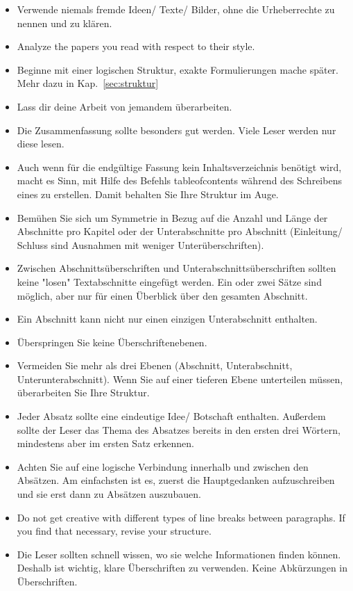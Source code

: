\begin{itemize}
\item  Verwende niemals fremde Ideen/ Texte/ Bilder, ohne die Urheberrechte zu nennen und zu klären. 
\item  Analyze the papers you read with respect to their style.	
\item  Beginne mit einer logischen Struktur, exakte Formulierungen mache später. Mehr dazu in Kap.~\ref{sec:struktur}
\item Lass dir deine Arbeit von jemandem überarbeiten.
\item  Die Zusammenfassung sollte besonders gut werden. Viele Leser werden nur diese lesen.
\item  Auch wenn für die endgültige Fassung kein Inhaltsverzeichnis benötigt wird, macht es Sinn, mit Hilfe des Befehls 
tableofcontents während des Schreibens eines zu erstellen. Damit behalten Sie Ihre Struktur im Auge. %
\item Bemühen Sie sich um Symmetrie in Bezug auf die Anzahl und Länge der Abschnitte pro Kapitel oder der Unterabschnitte pro Abschnitt (Einleitung/ Schluss sind Ausnahmen mit weniger Unterüberschriften). 



\item Zwischen Abschnittsüberschriften und Unterabschnittsüberschriften sollten keine "losen" Textabschnitte eingefügt werden. Ein oder zwei Sätze sind möglich, aber nur für einen Überblick über den gesamten Abschnitt.


\item Ein Abschnitt kann nicht nur einen einzigen Unterabschnitt enthalten.

\item Überspringen Sie keine Überschriftenebenen.


\item Vermeiden Sie mehr als drei Ebenen (Abschnitt, Unterabschnitt, Unterunterabschnitt). Wenn Sie auf einer tieferen Ebene unterteilen müssen, überarbeiten Sie Ihre Struktur.

\item Jeder Absatz sollte eine eindeutige Idee/ Botschaft enthalten. Außerdem sollte der Leser das Thema des Absatzes bereits in den ersten drei Wörtern, mindestens aber im ersten Satz erkennen.

\item Achten Sie auf eine logische Verbindung innerhalb und zwischen den Absätzen. Am einfachsten ist es, zuerst die Hauptgedanken aufzuschreiben und sie erst dann zu Absätzen auszubauen.

\item  Do not get creative with different types of line breaks between paragraphs. If you find that necessary, revise your structure.

\item Die Leser sollten schnell wissen, wo sie welche Informationen finden können. Deshalb ist wichtig, klare Überschriften zu verwenden. Keine Abkürzungen in Überschriften.

\end{itemize}